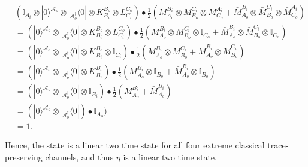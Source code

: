 \documentclass[aps,pra, twocolumn]{revtex4-1}
\begin{document}
\begin{align} 
& (\mathbb{I}_{A_i} \otimes |0 \rangle ^{\mathcal{A}_o}\! \otimes\! \,_{\mathcal{A}^{\dagger}_o} \langle 0|\otimes  K_{B_i}^{B_o} \otimes  L_{C_i}^{C_o}) \bullet  \frac{1}{2}(M_{A_o} ^{B_i}\otimes M_{B_o} ^{C_i} \otimes M_{C_o} ^{A_i} + \bar{M}_{A_o} ^{B_i} \otimes \bar{M}_{B_o} ^{C_i} \otimes \bar{M}_{C_o} ^{A_i})
\nonumber \\
&=( |0 \rangle ^{\mathcal{A}_o}\! \otimes\! \,_{\mathcal{A}^{\dagger}_o} \langle 0|\otimes  K_{B_i}^{B_o} \otimes  L_{C_i}^{C_o}) \bullet  \frac{1}{2}(M_{A_o} ^{B_i}\otimes M_{B_o} ^{C_i} \otimes \mathbb{I}_{C_o}  + \bar{M}_{A_o} ^{B_i} \otimes \bar{M}_{B_o} ^{C_i} \otimes \mathbb{I}_{C_o})
\nonumber \\
&=( |0 \rangle ^{\mathcal{A}_o}\! \otimes\! \,_{\mathcal{A}^{\dagger}_o} \langle 0|\otimes  K_{B_i}^{B_o} \otimes  \mathbb{I}_{C_i}) \bullet  \frac{1}{2}(M_{A_o} ^{B_i}\otimes M_{B_o} ^{C_i}  + \bar{M}_{A_o} ^{B_i} \otimes \bar{M}_{B_o} ^{C_i} )
\nonumber \\
&=( |0 \rangle ^{\mathcal{A}_o}\! \otimes\! \,_{\mathcal{A}^{\dagger}_o} \langle 0|\otimes  K_{B_i}^{B_o} ) \bullet  \frac{1}{2}(M_{A_o} ^{B_i}\otimes \mathbb{I}_{B_o}  + \bar{M}_{A_o} ^{B_i} \otimes \mathbb{I}_{B_o} )
\nonumber \\
&=( |0 \rangle ^{\mathcal{A}_o}\! \otimes\! \,_{\mathcal{A}^{\dagger}_o} \langle 0|\otimes  \mathbb{I}_{B_i} ) \bullet  \frac{1}{2}(M_{A_o} ^{B_i} + \bar{M}_{A_o} ^{B_i}  )
\nonumber \\
&=( |0 \rangle ^{\mathcal{A}_o}\! \otimes\! \,_{\mathcal{A}^{\dagger}_o} \langle 0| ) \bullet  \mathbb{I}_{A_o} )
\nonumber \\
&=1.
\end{align} 

Hence, the state is a linear two time state for all four extreme classical trace-preserving channels, and thus $\eta$ is a linear two time state. 
\end{document}
